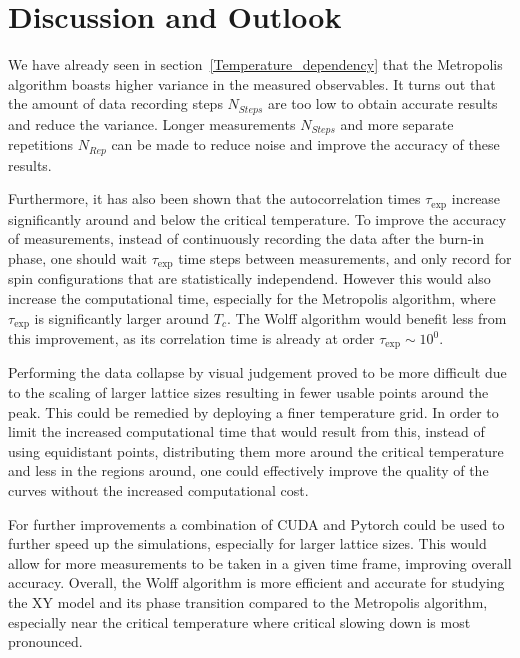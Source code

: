 \section{Discussion and Outlook}
\label{sec:discussion}
We have already seen in section~\ref{Temperature_dependency} that the Metropolis algorithm boasts higher variance in the measured observables.
It turns out that the amount of data recording steps $N_{Steps}$ are too low to obtain accurate results and reduce the variance.
Longer measurements $N_{Steps}$ and more separate repetitions $N_{Rep}$ can be made to reduce noise and improve the accuracy of these results.
\par
Furthermore, it has also been shown that the autocorrelation times $\tau_{\text{exp}}$ increase significantly around and below the critical temperature.
To improve the accuracy of measurements, instead of continuously recording the data after the burn-in phase, one should wait $\tau_{\text{exp}}$ time steps between measurements, and only record for spin configurations that are statistically independend.
However this would also increase the computational time, especially for the Metropolis algorithm, where $\tau_{\text{exp}}$ is significantly larger around $T_c$.
The Wolff algorithm would benefit less from this improvement, as its correlation time is already at order $\tau_{\text{exp}} \sim 10^0$.
\par
Performing the data collapse by visual judgement proved to be more difficult due to the scaling of larger lattice sizes resulting in fewer usable points around the peak.
This could be remedied by deploying a finer temperature grid.
In order to limit the increased computational time that would result from this, instead of using equidistant points, distributing them more around the critical temperature and less in the regions around, one could effectively improve the quality of the curves without the increased computational cost.
\par
For further improvements a combination of CUDA and Pytorch could be used to further speed up the simulations, especially for larger lattice sizes.
This would allow for more measurements to be taken in a given time frame, improving overall accuracy.
Overall, the Wolff algorithm is more efficient and accurate for studying the XY model and its phase transition compared to the Metropolis algorithm, especially near the critical temperature where critical slowing down is most pronounced.